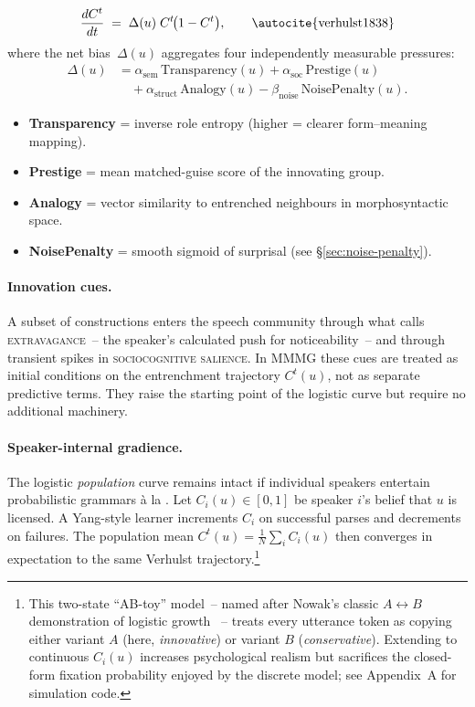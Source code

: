 \documentclass[12pt]{article}
\begin{document}
\begin{equation}
\frac{dC^{t}}{dt} \;=\; \Delta(u)\;C^{t}\!\bigl(1-C^{t}\bigr),
\qquad
\text{\autocite{verhulst1838}}
\end{equation}
where the net bias~$\Delta(u)$ aggregates four independently measurable pressures:
\begin{equation}\label{eq:delta-expanded}
\begin{split}
\Delta(u) &= \alpha_{\mathrm{sem}}\,\text{Transparency}(u) + \alpha_{\mathrm{soc}}\,\text{Prestige}(u) \\
&\quad + \alpha_{\mathrm{struct}}\,\text{Analogy}(u) - \beta_{\mathrm{noise}}\,\text{NoisePenalty}(u).
\end{split}
\end{equation}

\begin{itemize}
  \item \textbf{Transparency} = inverse role entropy (higher = clearer form–meaning mapping).
  \item \textbf{Prestige} = mean matched-guise score of the innovating group.
  \item \textbf{Analogy} = vector similarity to entrenched neighbours in morphosyntactic space.
  \item \textbf{NoisePenalty} = smooth sigmoid of surprisal (see \S\ref{sec:noise-penalty}).
\end{itemize}

\paragraph{Innovation cues.}
A subset of constructions enters the speech community through what \textcite{Bergs2025} calls \textsc{extravagance}~-- the speaker’s calculated push for noticeability~-- and through transient spikes in \textsc{sociocognitive salience}.  In MMMG these cues are treated as initial conditions on the entrenchment trajectory \(C^{t}(u)\), not as separate predictive terms.  They raise the starting point of the logistic curve but require no additional machinery.

\paragraph{Speaker-internal gradience.}
The logistic \emph{population} curve remains intact if individual speakers entertain probabilistic grammars à la \textcite{Yang2000}.  Let $C_i(u)\!\in[0,1]$ be speaker $i$'s belief that $u$ is licensed.  A Yang-style learner increments $C_i$ on successful parses and decrements on failures.  The population mean $C^{t}(u)=\tfrac1N\sum_i C_i(u)$ then converges in expectation to the same Verhulst trajectory.\footnote{This two-state \enquote{AB-toy} model~-- named after Nowak's classic $A{\leftrightarrow}B$ demonstration of logistic growth \citeyearpar{Nowak2001}~-- treats every utterance token as copying either variant $A$ (here, \emph{innovative}) or variant $B$ (\emph{conservative}).  Extending to continuous $C_i(u)$ increases psychological realism but sacrifices the closed-form fixation probability enjoyed by the discrete model; see Appendix~A for simulation code.}
\end{document}
